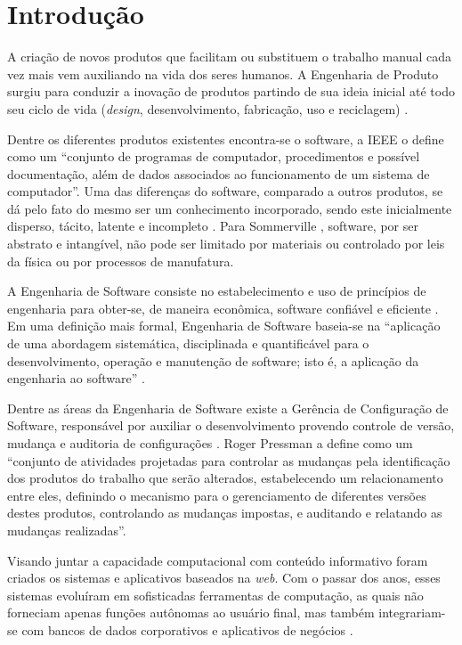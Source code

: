 \chapter{Introdução}
A criação de novos produtos que facilitam ou substituem o trabalho manual cada vez mais vem auxiliando na vida dos seres humanos. A Engenharia de Produto surgiu para conduzir a inovação de produtos partindo de sua ideia inicial até todo seu ciclo de vida (\textit{design}, desenvolvimento, fabricação, uso e reciclagem) \cite{ortloff2014}.

Dentre os diferentes produtos existentes encontra-se o software, a IEEE \cite{ieee_glossary} o define como um ``conjunto de programas de computador, procedimentos e possível documentação, além de dados associados ao funcionamento de um sistema de computador''. Uma das diferenças do software, comparado a outros produtos, se dá pelo fato do mesmo ser um conhecimento incorporado, sendo este inicialmente disperso, tácito, latente e incompleto \cite{baetjer1997}. Para Sommerville \cite{sommerville_2006}, software, por ser abstrato e intangível, não pode ser limitado por materiais ou controlado por leis da física ou por processos de manufatura.

A Engenharia de Software consiste no estabelecimento e uso de princípios de engenharia para obter-se, de maneira econômica, software confiável e eficiente \cite{naur_1969}. Em uma definição mais formal, Engenharia de Software baseia-se na ``aplicação de uma abordagem sistemática, disciplinada e quantificável para o desenvolvimento, operação e manutenção de software; isto é, a aplicação da engenharia ao software'' \cite{ieee_glossary}.

Dentre as áreas da Engenharia de Software existe a Gerência de Configuração de Software, responsável por auxiliar o desenvolvimento provendo controle de versão, mudança e auditoria de configurações \cite{SWEBOK2014}. Roger Pressman \cite{pressman_2009} a define como um ``conjunto de atividades projetadas para controlar as mudanças pela identificação dos produtos do trabalho que serão alterados, estabelecendo um relacionamento entre eles, definindo o mecanismo para o gerenciamento de diferentes versões destes produtos, controlando as mudanças impostas, e auditando e relatando as mudanças realizadas''.

Visando juntar a capacidade computacional com conteúdo informativo foram criados os sistemas e aplicativos baseados na \textit{web}. Com o passar dos anos, esses sistemas evoluíram em sofisticadas ferramentas de computação, as quais não forneciam apenas funções autônomas ao usuário final, mas também integrariam-se com bancos de dados corporativos e aplicativos de negócios \cite{pressman_2009}.

